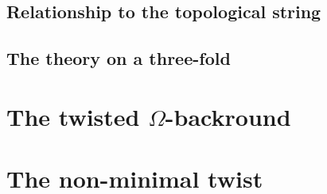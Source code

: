 \documentclass[11pt]{amsart}
\begin{document}
\subsection{Relationship to the topological string}


\subsection{The theory on a three-fold}


\section{The twisted $\Omega$-backround} 

\section{The non-minimal twist} 
\end{document}
